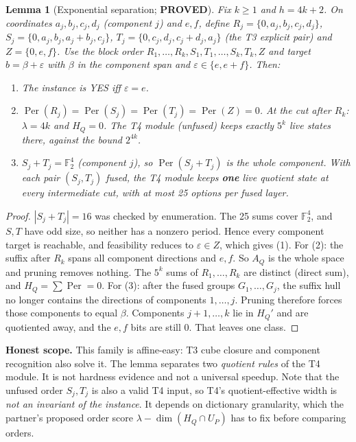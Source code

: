 \documentclass[11pt]{article}
\newtheorem{lemma}[proposition]{Lemma}
\newcommand{\Per}{\operatorname{Per}}
\newcommand{\F}{\mathbb{F}_2}
\begin{document}
\begin{lemma}[Exponential separation; \textbf{PROVED}]\label{lem:sep}
Fix $k\ge1$ and $h=4k+2$. On coordinates $a_j,b_j,c_j,d_j$ (component $j$) and $e,f$, define $R_j=\{0,a_j,b_j,c_j,d_j\}$,
$S_j=\{0,a_j,b_j,a_j{+}b_j,c_j\}$, $T_j=\{0,c_j,d_j,c_j{+}d_j,a_j\}$ (the T3 explicit pair) and $Z=\{0,e,f\}$. Use the block order
$R_1,\dots,R_k,S_1,T_1,\dots,S_k,T_k,Z$ and target $b=\beta+\varepsilon$ with $\beta$ in the component span and $\varepsilon\in\{e,e{+}f\}$. Then:
\begin{enumerate}
\item The instance is YES iff $\varepsilon=e$.
\item $\Per(R_j)=\Per(S_j)=\Per(T_j)=\Per(Z)=0$. At the cut after $R_k$: $\lambda=4k$ and $H_Q=0$. The T4 module (unfused) keeps exactly $5^k$ live states there,
against the bound $2^{4k}$.
\item $S_j+T_j=\F^4$ (component $j$), so $\Per(S_j+T_j)$ is the whole component. With each pair $(S_j,T_j)$ fused, the T4 module keeps
\textbf{one} live quotient state at every intermediate cut, with at most 25 options per fused layer.
\end{enumerate}
\end{lemma}
\begin{proof}
$|S_j+T_j|=16$ was checked by enumeration. The 25 sums cover $\F^4$, and $S,T$ have odd size, so neither has a nonzero period. Hence every component target is reachable,
and feasibility reduces to $\varepsilon\in Z$, which gives (1). For (2): the suffix after $R_k$ spans all component directions and $e,f$. So $A_Q$ is the whole space and pruning removes nothing.
The $5^k$ sums of $R_1,\dots,R_k$ are distinct (direct sum), and $H_Q=\sum\Per=0$. For (3): after the fused groups $G_1,\dots,G_j$, the suffix hull no longer contains the directions of components
$1,\dots,j$. Pruning therefore forces those components to equal $\beta$. Components $j{+}1,\dots,k$ lie in $H_Q'$ and are quotiented away, and the $e,f$ bits are still $0$. That leaves one class.
\end{proof}
\noindent\textbf{Honest scope.} This family is affine-easy: T3 cube closure and component recognition also solve it. The lemma separates two
\emph{quotient rules} of the T4 module. It is not hardness evidence and not a universal speedup. Note that the unfused order $S_j,T_j$ is
also a valid T4 input, so T4's quotient-effective width is \emph{not an invariant of the instance}. It depends on dictionary granularity, which the
partner's proposed order score $\lambda-\dim(H_Q\cap U_P)$ has to fix before comparing orders.
\end{document}
